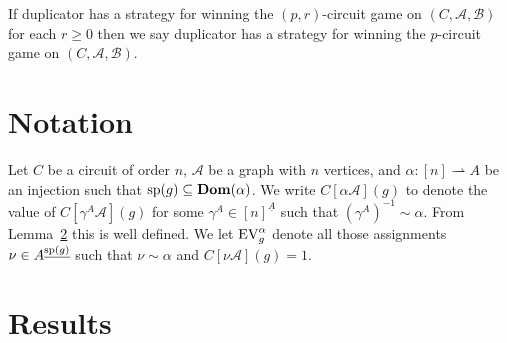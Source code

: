 \documentclass[../main/thesis.tex]{subfiles}
\begin{document}
If duplicator has a strategy for winning the $(p,r)$-circuit game on $(C,
\mathcal{A}, \mathcal{B})$ for each $r \geq 0$ then we say duplicator has a
strategy for winning the $p$-circuit game on $(C, \mathcal{A}, \mathcal{B})$.

\section{Notation}
Let $C$ be a circuit of order $n$, $\mathcal{A}$ be a graph with $n$ vertices,
and $\alpha : [n] \rightharpoonup A$ be an injection such that $\text{sp}(g)
\subseteq \text{\textbf{Dom}}(\alpha)$. We write $C[\alpha\mathcal{A}](g)$ to denote the value
of $C[\gamma^A \mathcal{A}](g)$ for some $\gamma^A \in [n]^{\underline{A}}$ such
that $(\gamma^A)^{-1} \sim \alpha$. From Lemma~\ref{} this is well defined. We
let $\text{EV}^\alpha_g$ denote all those assignments $\nu \in
A^{\underline{\text{sp}(g)}}$ such that $\nu \sim \alpha$ and $C[\nu
\mathcal{A}](g) = 1$.

\section{Results}
\end{document}
